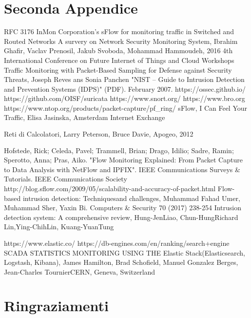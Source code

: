 \documentclass[12pt,a4paper,openright,twoside]{report}
\begin{document}
\chapter{Seconda Appendice}             %
\begin{thebibliography}{90}             %
\rhead[\fancyplain{}{\bfseries \leftmark}]{\fancyplain{}{\bfseries
\thepage}}
 RFC 3176 InMon Corporation's sFlow for monitoring traffic in Switched
and Routed Networks
 A survery on Network Security Monitoring System,
Ibrahim Ghafir, Vaclav Prenosil, Jakub Svoboda, Mohammad Hammoudeh,
 2016 4th International Conference on Future Internet of Things and Cloud Workshops
 Traffic Monitoring with Packet-Based Sampling for Defense against Security Threats, Joseph Reves ans Sonia Panchen
 "NIST – Guide to Intrusion Detection and Prevention Systems (IDPS)" (PDF). February 2007.
 https://ossec.github.io/
 https://github.com/OISF/suricata
 https://www.snort.org/
 https://www.bro.org
 https://www.ntop.org/products/packet-capture/pf\_ring/
 sFlow, I Can Feel Your Traffic, Elisa Jasinska, Amsterdam Internet Exchange


 Reti di Calcolatori, Larry Peterson, Bruce Davie, Apogeo, 2012

 Hofstede, Rick; Celeda, Pavel; Trammell, Brian; Drago, Idilio; Sadre, Ramin; Sperotto, Anna; Pras, Aiko. "Flow Monitoring Explained: From Packet Capture to Data Analysis with NetFlow and IPFIX". IEEE Communications Surveys & Tutorials. IEEE Communications Society
 http://blog.sflow.com/2009/05/scalability-and-accuracy-of-packet.html
 Flow-based intrusion detection: Techniquesand challenges, Muhammad Fahad Umer, Muhammad Sher, Yaxin Bi. Computers \& Security 70 (2017) 238-254
 Intrusion detection system: A comprehensive review, Hung-JenLiao, Chun-HungRichard Lin,Ying-ChihLin, Kuang-YuanTung

 https://www.elastic.co/
 https://db-engines.com/en/ranking/search+engine
 SCADA STATISTICS MONITORING USING THE Elastic Stack(Elasticsearch, Logstash, Kibana), James Hamilton, Brad Schofield, Manuel Gonzalez Berges, Jean-Charles TournierCERN, Geneva, Switzerland
\end{thebibliography}
\clearpage{\pagestyle{empty}\cleardoublepage}
\chapter*{Ringraziamenti}
\thispagestyle{empty}
\end{document}
